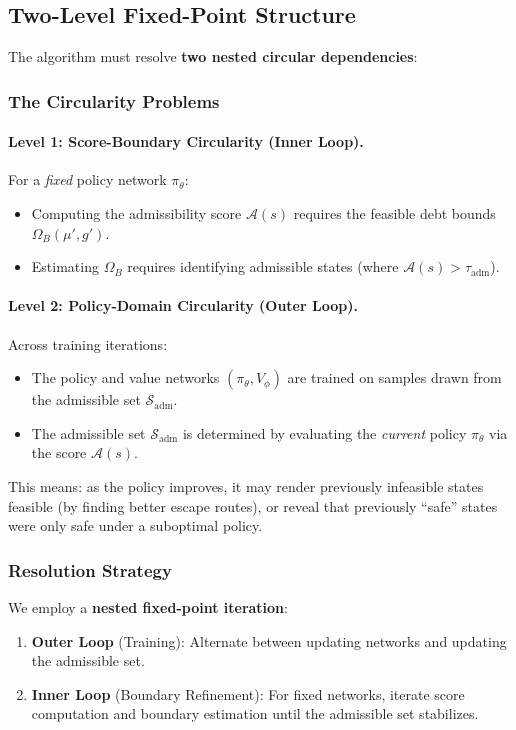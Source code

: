 \subsection{Two-Level Fixed-Point Structure}\label{sec:fixed_point}

The algorithm must resolve \textbf{two nested circular dependencies}:

\subsubsection{The Circularity Problems}

\paragraph{Level 1: Score-Boundary Circularity (Inner Loop).}
For a \textit{fixed} policy network $\pi_\theta$:
\begin{itemize}
    \item Computing the admissibility score $\mathcal{A}(s)$ requires the feasible debt bounds $\Omega_B(\mu', g')$.
    \item Estimating $\Omega_B$ requires identifying admissible states (where $\mathcal{A}(s) > \tau_{\text{adm}}$).
\end{itemize}

\paragraph{Level 2: Policy-Domain Circularity (Outer Loop).}
Across training iterations:
\begin{itemize}
    \item The policy and value networks $(\pi_\theta, V_\phi)$ are trained on samples drawn from the admissible set $\mathcal{S}_{\text{adm}}$.
    \item The admissible set $\mathcal{S}_{\text{adm}}$ is determined by evaluating the \textit{current} policy $\pi_\theta$ via the score $\mathcal{A}(s)$.
\end{itemize}

\noindent This means: as the policy improves, it may render previously infeasible states feasible (by finding better escape routes), or reveal that previously ``safe'' states were only safe under a suboptimal policy.

\subsubsection{Resolution Strategy}
We employ a \textbf{nested fixed-point iteration}:
\begin{enumerate}
    \item \textbf{Outer Loop} (Training): Alternate between updating networks and updating the admissible set.
    \item \textbf{Inner Loop} (Boundary Refinement): For fixed networks, iterate score computation and boundary estimation until the admissible set stabilizes.
\end{enumerate}

